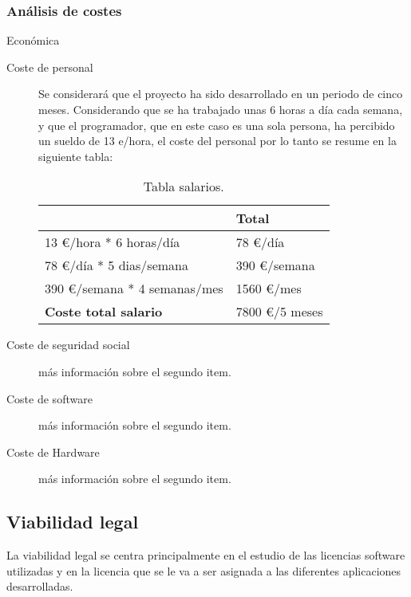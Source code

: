 \subsubsection{Análisis de costes}\label{costes}
Económica
\begin{description}
	\item[Coste de personal] Se considerará que el proyecto ha sido desarrollado en un periodo de cinco meses.  Considerando que se ha trabajado unas 6 horas a día cada semana, y que el programador, que en este caso es una sola persona, ha percibido un sueldo de 13 e/hora, el coste del personal por lo tanto se resume en la siguiente tabla:
	
\begin{table}[htbp]
\begin{center}
\begin{tabular}{|l|l|}
\hline
 & Total \\
\hline \hline
13 \euro /hora * 6 horas/día &   78 \euro /día \\ \hline
78 \euro /día * 5 dias/semana &   390 \euro /semana \\ \hline
390 \euro /semana * 4 semanas/mes &   1560 \euro /mes \\ \hline
\textbf{Coste total salario} &   7800 \euro /5 meses \\ \hline
\end{tabular}
\caption{Tabla salarios.}
\label{tabla:salarios}
\end{center}
\end{table}
	
	\item[Coste de seguridad social] más información sobre el segundo item.
	
	\item[Coste de software] más información sobre el segundo item.
	
	\item[Coste de Hardware] más información sobre el segundo item.

\end{description}

\subsection{Viabilidad legal}\label{viabilidad-legal}
La viabilidad legal se centra principalmente en el estudio de las licencias software utilizadas y en la licencia que se le va a ser asignada a las diferentes aplicaciones desarrolladas.




